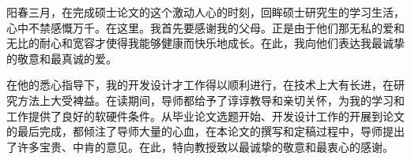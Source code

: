 \begin{ack}
阳春三月，在完成硕士论文的这个激动人心的时刻，回眸硕士研究生的学习生活，心中不禁感慨万千。在这里。我首先要感谢我的父母。正是由于他们那无私的爱和无比的耐心和宽容才使得我能够健康而快乐地成长。在此，我向他们表达我最诚挚的敬意和最真诚的爱。

在他的悉心指导下，我的开发设计才工作得以顺利进行，在技术上大有长进，在研究方法上大受裨益。在读期间，导师都给予了谆谆教导和亲切关怀，为我的学习和工作提供了良好的软硬件条件。从毕业论文选题开始、开发设计工作的开展到论文的最后完成，都倾注了导师大量的心血，在本论文的撰写和定稿过程中，导师提出了许多宝贵、中肯的意见。在此，特向教授致以最诚挚的敬意和最衷心的感谢。
\end{ack}
